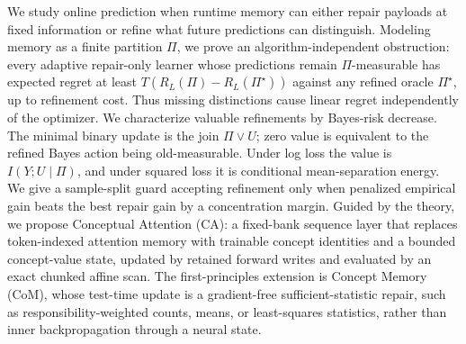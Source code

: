 We study online prediction when runtime memory can either repair payloads at fixed information or refine what future predictions can distinguish. Modeling memory as a finite partition $\Pi$, we prove an algorithm-independent obstruction: every adaptive repair-only learner whose predictions remain $\Pi$-measurable has expected regret at least $T(R_L(\Pi)-R_L(\Pi^\star))$ against any refined oracle $\Pi^\star$, up to refinement cost. Thus missing distinctions cause linear regret independently of the optimizer. We characterize valuable refinements by Bayes-risk decrease. The minimal binary update is the join $\Pi\vee U$; zero value is equivalent to the refined Bayes action being old-measurable. Under log loss the value is $I(Y;U\mid\Pi)$, and under squared loss it is conditional mean-separation energy. We give a sample-split guard accepting refinement only when penalized empirical gain beats the best repair gain by a concentration margin. Guided by the theory, we propose Conceptual Attention (CA): a fixed-bank sequence layer that replaces token-indexed attention memory with trainable concept identities and a bounded concept-value state, updated by retained forward writes and evaluated by an exact chunked affine scan. The first-principles extension is Concept Memory (CoM), whose test-time update is a gradient-free sufficient-statistic repair, such as responsibility-weighted counts, means, or least-squares statistics, rather than inner backpropagation through a neural state.
